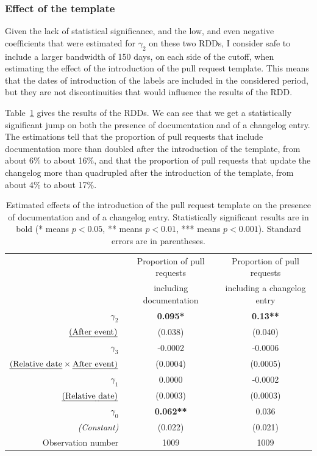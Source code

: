 \subsubsection{Effect of the template}

Given the lack of statistical significance, and the low, and even negative coefficients that were estimated for $\gamma_2$ on these two RDDs, I consider safe to include a larger bandwidth of 150 days, on each side of the cutoff, when estimating the effect of the introduction of the pull request template.
This means that the dates of introduction of the labels are included in the considered period, but they are not discontinuities that would influence the results of the RDD.

Table~\ref{tab:template} gives the results of the RDDs.
We can see that we get a statistically significant jump on both the presence of documentation and of a changelog entry.
The estimations tell that the proportion of pull requests that include documentation more than doubled after the introduction of the template, from about 6\% to about 16\%, and that the proportion of pull requests that update the changelog more than quadrupled after the introduction of the template, from about 4\% to about 17\%.

\begin{table}
	\begin{center}
	\begin{tabular}{|r|c|c|}
		\hline
		& Proportion of pull requests & Proportion of pull requests \\
		& including documentation & including a changelog entry \\
		\hline
		$\gamma_2$ & \textbf{0.095*} & \textbf{0.13**} \\
		$\mbox{\emph{(After event)}}$ & (0.038) & (0.040) \\
		\hline
		$\gamma_3$ & -0.0002 & -0.0006 \\
		$\mbox{\emph{(Relative date}} \times \mbox{\emph{After event)}}$ & (0.0004) & (0.0005) \\
		\hline
		$\gamma_1$ & 0.0000 & -0.0002 \\
		$\mbox{\emph{(Relative date)}}$ & (0.0003) & (0.0003) \\
		\hline
		$\gamma_0$ & \textbf{0.062**} & 0.036 \\
		\emph{(Constant)} & (0.022) & (0.021) \\
		\hline
		Observation number & 1009 & 1009 \\
		\hline
	\end{tabular}
	\caption{
		Estimated effects of the introduction of the pull request template on the presence of documentation and of a changelog entry.
		Statistically significant results are in bold (* means $p < 0.05$, ** means $p < 0.01$, *** means $p < 0.001$).
		Standard errors are in parentheses.
	}
	\label{tab:template}
	\end{center}
\end{table}

